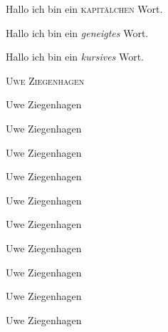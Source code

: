 \documentclass[15pt,ngerman]{scrbook}
\newcommand{\person}[1]{\textsc{#1}}
\begin{document}
Hallo ich bin ein \textsc{kapitälchen} Wort.

Hallo ich bin ein \textsl{geneigtes} Wort.

Hallo ich bin ein \textit{kursives} Wort.

\person{Uwe Ziegenhagen}

{\tiny Uwe Ziegenhagen}

{\scriptsize Uwe Ziegenhagen}

{\footnotesize Uwe Ziegenhagen}

{\small Uwe Ziegenhagen}

{\normalsize Uwe Ziegenhagen}

{\large Uwe Ziegenhagen}

{\Large Uwe Ziegenhagen}

{\LARGE Uwe Ziegenhagen}

{\huge Uwe Ziegenhagen}

{\Huge Uwe Ziegenhagen}

\scalebox{50}{U}
\end{document}
